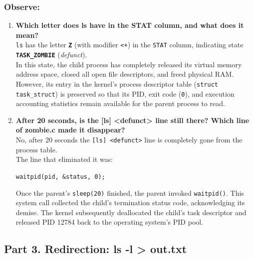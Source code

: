 \documentclass{labreport}
\begin{document}
\subsubsection*{Observe:}
\begin{enumerate}[leftmargin=*]
    \item \textbf{Which letter does ls have in the STAT column, and what does it mean?}\\[0.2em]
    \texttt{ls} has the letter \textbf{\texttt{Z}} (with modifier \texttt{<+}) in the \texttt{STAT} column, indicating state \textbf{\texttt{TASK\_ZOMBIE}} (\textit{defunct}).\\
    In this state, the child process has completely released its virtual memory address space, closed all open file descriptors, and freed physical RAM. However, its entry in the kernel's process descriptor table (\texttt{struct task\_struct}) is preserved so that its PID, exit code (\texttt{0}), and execution accounting statistics remain available for the parent process to read.

    \item \textbf{After 20 seconds, is the [ls] <defunct> line still there? Which line of zombie.c made it disappear?}\\[0.2em]
    No, after 20 seconds the \texttt{[ls] <defunct>} line is completely gone from the process table.\\
    The line that eliminated it was:
    \begin{center}
    \texttt{waitpid(pid, \&status, 0);}
    \end{center}
    Once the parent's \texttt{sleep(20)} finished, the parent invoked \texttt{waitpid()}. This system call collected the child's termination status code, acknowledging its demise. The kernel subsequently deallocated the child's task descriptor and released PID 12784 back to the operating system's PID pool.
\end{enumerate}

\subsection{Part 3. Redirection: ls -l > out.txt}
\end{document}
